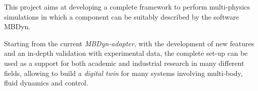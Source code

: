 This project aims at developing a complete framework to perform multi-physics simulations in which a component can be suitably described by the software MBDyn.  

Starting from the current \textit{MBDyn-adapter}, with the development of new features and an in-depth validation with experimental data, the complete set-up can be used as a support for both academic and industrial research in many different fields, allowing to build a \textit{digital twin} for many systems involving multi-body, fluid dynamics and control.